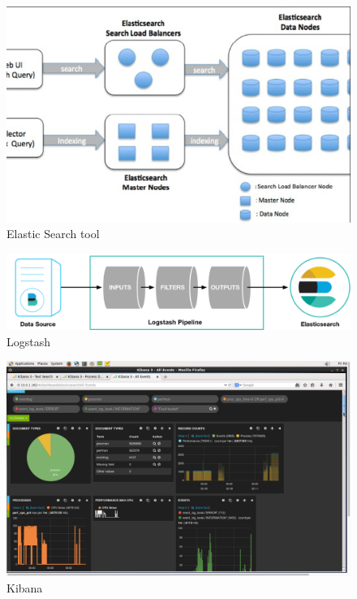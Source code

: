 \begin{figure}[!ht]
  \centering\includegraphics[width=\columnwidth]{image/elasticsearch}
  \caption{Elastic Search tool~\cite{hid-sp18-410-elk-comp1}}
\label{f:elasticsearch}
\end{figure}

\begin{figure}[!ht]
  \centering\includegraphics[width=\columnwidth]{image/logstash.png}
  \caption{Logstash~\cite{hid-sp18-410-elk-comp2}}\label{f:logstash}
\end{figure}

\begin{figure}[!ht]
  \centering\includegraphics[width=\columnwidth]{image/kibana.png}
  \caption{Kibana~\cite{hid-sp18-410-elk-comp3}}\label{f:kibana}
\end{figure}


